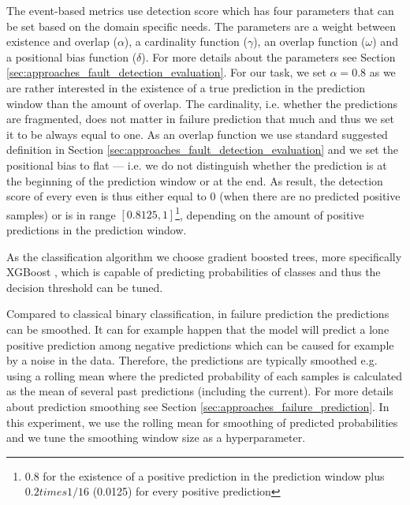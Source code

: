 The event-based metrics use detection score which has four parameters that can be set based on the domain specific needs.
The parameters are a weight between existence and overlap ($\alpha$), a cardinality function ($\gamma$), an overlap function ($\omega$) and a positional bias function ($\delta$).
For more details about the parameters see Section \ref{sec:approaches_fault_detection_evaluation}.
For our task, we set $\alpha = 0.8$ as we are rather interested in the existence of a true prediction in the prediction window than the amount of overlap.
The cardinality, i.e. whether the predictions are fragmented, does not matter in failure prediction that much and thus we set it to be always equal to one.
As an overlap function we use standard suggested definition in Section \ref{sec:approaches_fault_detection_evaluation} and we set the positional bias to flat --- i.e. we do not distinguish whether the prediction is at the beginning of the prediction window or at the end.
As result, the detection score of every even is thus either equal to 0 (when there are no predicted positive samples) or is in range $[0.8125, 1]$\footnote{0.8 for the existence of a positive prediction in the prediction window plus $0.2 times 1/16$ (0.0125) for every positive prediction}, depending on the amount of positive predictions in the prediction window.

As the classification algorithm we choose gradient boosted trees, more specifically XGBoost \cite{xgboost}, which is capable of predicting probabilities of classes and thus the decision threshold can be tuned.

Compared to classical binary classification, in failure prediction the predictions can be smoothed.
It can for example happen that the model will predict a lone positive prediction among negative predictions which can be caused for example by a noise in the data.
Therefore, the predictions are typically smoothed e.g. using a rolling mean where the predicted probability of each samples is calculated as the mean of several past predictions (including the current).
For more details about prediction smoothing see Section \ref{sec:approaches_failure_prediction}.
In this experiment, we use the rolling mean for smoothing of predicted probabilities and we tune the smoothing window size as a hyperparameter.

